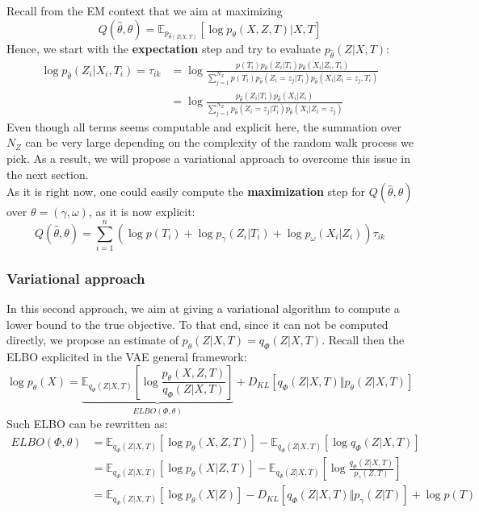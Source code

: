 Recall from the EM context that we aim at maximizing
$$
Q(\widehat{\theta}, \theta) = \mathbb{E}_{p_{\widehat{\theta}(Z|X,T)}}[\log p_{\theta}(X, Z, T) | X,T]
$$
Hence, we start with the \textbf{expectation} step and try to evaluate $p_{\widehat{\theta}}(Z|X,T)$:
$$
\begin{align}
    \log p_{\widehat{\theta}}(Z_i|X_i,T_i) = \tau_{ik} &= \log \frac{p(T_i) p_{\widehat{\theta}}(Z_i | T_i) p_{\widehat{\theta}}(X_i | Z_i, T_i)}{\sum_{j=1}^{N_Z} p(T_i) p_{\widehat{\theta}}(Z_i=z_j | T_i) p_{\widehat{\theta}}(X_i | Z_i=z_j, T_i)} \\
                                &= \log \frac{p_{\widehat{\theta}}(Z_i | T_i) p_{\widehat{\theta}}(X_i | Z_i)}{\sum_{j=1}^{N_Z} p_{\widehat{\theta}}(Z_i=z_j | T_i) p_{\widehat{\theta}}(X_i | Z_i=z_j)}
\end{align}
$$
Even though all terms seems computable and explicit here, the summation over $N_Z$ can be very large depending on the complexity of the random walk process we pick.
As a result, we will propose a variational approach to overcome this issue in the next section. \\

As it is right now, one could easily compute the \textbf{maximization} step for $Q(\widehat{\theta}, \theta)$ over $\theta = (\gamma, \omega)$, as it is now explicit:
$$
Q(\widehat{\theta}, \theta) = \sum_{i=1}^n (\log p(T_i) + \log p_{\gamma}(Z_i | T_i) + \log p_{\omega}(X_i | Z_i)) \tau_{ik}
$$

\subsubsection{Variational approach}

In this second approach, we aim at giving a variational algorithm to compute a lower bound to the true objective.
To that end, since it can not be computed directly, we propose an estimate of $p_{\theta}(Z|X,T) = q_{\Phi}(Z|X,T)$.
Recall then the ELBO explicited in the VAE general framework:
$$
\log p_{\theta}(X) = \underbrace{\mathbb{E}_{q_{\Phi}(Z|X,T)}\left[ \log \frac{p_{\theta}(X,Z,T)}{q_{\Phi}(Z|X,T)} \right]}_{ELBO(\Phi, \theta)} + D_{KL}[q_{\Phi}(Z|X,T) \Vert p_{\theta}(Z|X,T)]
$$
Such ELBO can be rewritten as:
$$
\begin{align}
    ELBO(\Phi, \theta) &= \mathbb{E}_{q_{\Phi}(Z|X,T)}[\log p_{\theta}(X,Z,T)] - \mathbb{E}_{q_{\Phi}(Z|X,T)}[\log q_{\Phi}(Z|X,T)] \\
                        &= \mathbb{E}_{q_{\Phi}(Z|X,T)}[\log p_{\theta}(X|Z,T)] - \mathbb{E}_{q_{\Phi}(Z|X,T)}\left[ \log \frac{q_{\Phi}(Z|X,T)}{p_{\gamma}(Z,T)} \right] \\
                        &= \mathbb{E}_{q_{\Phi}(Z|X,T)}[\log p_{\theta}(X|Z)] - D_{KL}[q_{\Phi}(Z|X,T) \Vert p_{\gamma}(Z|T)] + \log p(T)
\end{align}
$$

